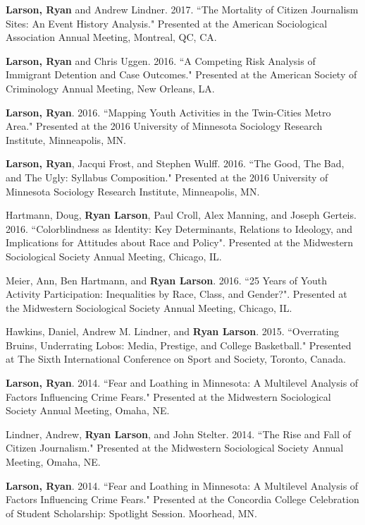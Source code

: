 \documentclass[letterpaper]{article}
\renewenvironment{itemize}{
  \begin{list}{}{
    \setlength{\leftmargin}{1.5em}
  }
}{
  \end{list}
}
\begin{document}
\begin{itemize}
\item \textbf{Larson, Ryan} and Andrew Lindner. 2017. ``The Mortality of Citizen Journalism Sites: An Event History Analysis." Presented at the American Sociological Association Annual Meeting, Montreal, QC, CA.
\item \textbf{Larson, Ryan} and Chris Uggen. 2016. ``A Competing Risk Analysis of Immigrant Detention and Case Outcomes." Presented at the American Society of Criminology Annual Meeting, New Orleans, LA. 
\item \textbf{Larson, Ryan}. 2016. ``Mapping Youth Activities in the Twin-Cities Metro Area." Presented at the 2016 University of Minnesota Sociology Research Institute, Minneapolis, MN. 
\item \textbf{Larson, Ryan}, Jacqui Frost, and Stephen Wulff. 2016. ``The Good, The Bad, and The Ugly: Syllabus Composition." Presented at the 2016 University of Minnesota Sociology Research Institute, Minneapolis, MN. 
\item Hartmann, Doug, \textbf{Ryan Larson}, Paul Croll, Alex Manning,  and Joseph Gerteis. 2016. ``Colorblindness as Identity:  Key Determinants, Relations to Ideology, and Implications for Attitudes about Race and Policy". Presented at the Midwestern Sociological Society Annual Meeting, Chicago, IL. 
\item Meier, Ann, Ben Hartmann, and \textbf{Ryan Larson}. 2016. ``25 Years of Youth Activity Participation: Inequalities by Race, Class, and Gender?". Presented at the Midwestern Sociological Society Annual Meeting, Chicago, IL. 
\item Hawkins, Daniel, Andrew M. Lindner, and \textbf{Ryan Larson}. 2015. ``Overrating Bruins, Underrating Lobos: Media, Prestige, and College Basketball." Presented at The Sixth International Conference on Sport and Society, Toronto, Canada.
\item \textbf{Larson, Ryan}. 2014. ``Fear and Loathing in Minnesota: A Multilevel Analysis of Factors Influencing Crime Fears." Presented at the Midwestern Sociological Society Annual Meeting, Omaha, NE.
\item Lindner, Andrew, \textbf{Ryan Larson}, and John Stelter. 2014. ``The Rise and Fall of Citizen Journalism." Presented at the Midwestern Sociological Society Annual Meeting, Omaha, NE. 
\item \textbf{Larson, Ryan}. 2014. ``Fear and Loathing in Minnesota: A Multilevel Analysis of Factors Influencing Crime Fears." Presented at the Concordia College Celebration of Student Scholarship: Spotlight Session. Moorhead, MN. 


\end{itemize}
\end{document}
